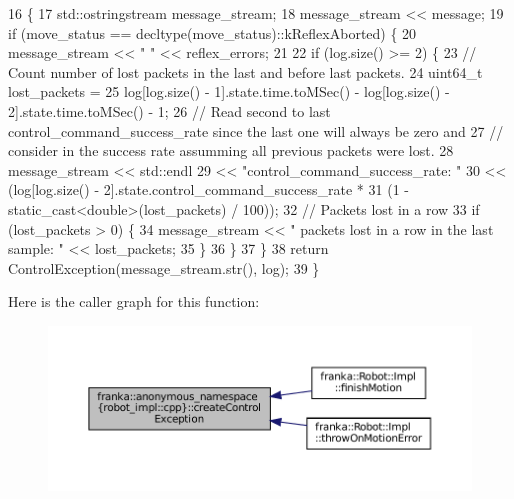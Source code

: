 \begin{DoxyCode}
16                                                                              \{
17   std::ostringstream message\_stream;
18   message\_stream << message;
19   \textcolor{keywordflow}{if} (move\_status == decltype(move\_status)::kReflexAborted) \{
20     message\_stream << \textcolor{stringliteral}{" "} << reflex\_errors;
21 
22     \textcolor{keywordflow}{if} (log.size() >= 2) \{
23       \textcolor{comment}{// Count number of lost packets in the last and before last packets.}
24       uint64\_t lost\_packets =
25           log[log.size() - 1].state.time.toMSec() - log[log.size() - 2].state.time.toMSec() - 1;
26       \textcolor{comment}{// Read second to last control\_command\_success\_rate since the last one will always be zero and}
27       \textcolor{comment}{// consider in the success rate assumming all previous packets were lost.}
28       message\_stream << std::endl
29                      << \textcolor{stringliteral}{"control\_command\_success\_rate: "}
30                      << (log[log.size() - 2].state.control\_command\_success\_rate *
31                          (1 - \textcolor{keyword}{static\_cast<}\textcolor{keywordtype}{double}\textcolor{keyword}{>}(lost\_packets) / 100));
32       \textcolor{comment}{// Packets lost in a row}
33       \textcolor{keywordflow}{if} (lost\_packets > 0) \{
34         message\_stream << \textcolor{stringliteral}{" packets lost in a row in the last sample: "} << lost\_packets;
35       \}
36     \}
37   \}
38   \textcolor{keywordflow}{return} ControlException(message\_stream.str(), log);
39 \}
\end{DoxyCode}
Here is the caller graph for this function\+:
\nopagebreak
\begin{figure}[H]
\begin{center}
\leavevmode
\includegraphics[width=350pt]{namespacefranka_1_1anonymous__namespace_02robot__impl_8cpp_03_ad774a35737682bade54336046f9d09b2_icgraph}
\end{center}
\end{figure}
